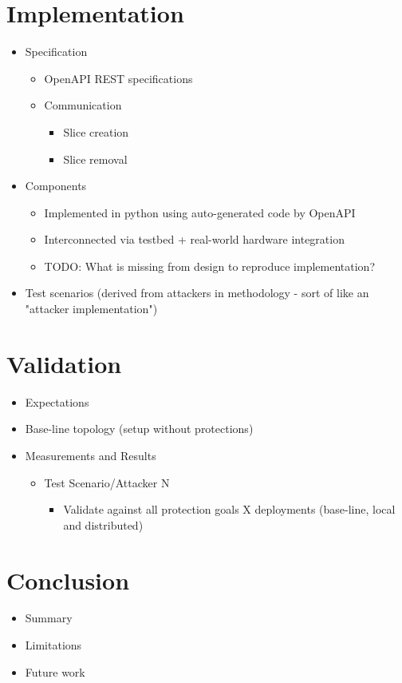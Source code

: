 \documentclass{article}
\begin{document}
\section{Implementation}
\begin{itemize}
    \item Specification
    \begin{itemize}
        \item OpenAPI REST specifications
        \item Communication
        \begin{itemize}
            \item Slice creation
            \item Slice removal
        \end{itemize}
    \end{itemize}
    \item Components
    \begin{itemize}
        \item Implemented in python using auto-generated code by OpenAPI
        \item Interconnected via testbed + real-world hardware integration
        \item TODO: What is missing from design to reproduce implementation?
    \end{itemize}
    \item Test scenarios (derived from attackers in methodology - sort of like an "attacker implementation")
\end{itemize}

\section{Validation}
\begin{itemize}
    \item Expectations
    \item Base-line topology (setup without protections)
    \item Measurements and Results
    \begin{itemize}
        \item Test Scenario/Attacker N
        \begin{itemize}
            \item Validate against all protection goals X deployments (base-line, local and distributed)
        \end{itemize}
    \end{itemize}
\end{itemize}

\section{Conclusion}
\begin{itemize}
    \item Summary
    \item Limitations
    \item Future work
\end{itemize}
\end{document}
